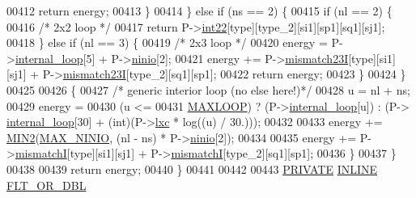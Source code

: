 \begin{DoxyCode}
00412         \textcolor{keywordflow}{return} energy;
00413       \}
00414     \} \textcolor{keywordflow}{else} \textcolor{keywordflow}{if} (ns == 2) \{
00415       \textcolor{keywordflow}{if} (nl == 2) \{
00416         \textcolor{comment}{/* 2x2 loop */}
00417         \textcolor{keywordflow}{return} P->\mbox{\hyperlink{group__energy__parameters_ad56fdeadc2a2e51b9f23b2c26d067ec4}{int22}}[type][type\_2][si1][sp1][sq1][sj1];
00418       \} \textcolor{keywordflow}{else} \textcolor{keywordflow}{if} (nl == 3) \{
00419         \textcolor{comment}{/* 2x3 loop */}
00420         energy  = P->\mbox{\hyperlink{group__energy__parameters_a2a4fb2c65023ec371c9b96573da6d2fc}{internal\_loop}}[5] + P->\mbox{\hyperlink{group__energy__parameters_ac03c4835310b225a64ea9eb77a174940}{ninio}}[2];
00421         energy  += P->\mbox{\hyperlink{group__energy__parameters_a2d8a2ed8936cd60fbed953a2bc64f9b3}{mismatch23I}}[type][si1][sj1] + P->\mbox{\hyperlink{group__energy__parameters_a2d8a2ed8936cd60fbed953a2bc64f9b3}{mismatch23I}}[type\_2][sq1][sp1];
00422         \textcolor{keywordflow}{return} energy;
00423       \}
00424     \}
00425 
00426     \{
00427       \textcolor{comment}{/* generic interior loop (no else here!)*/}
00428       u       = nl + ns;
00429       energy  =
00430         (u <=
00431          \mbox{\hyperlink{energy__const_8h_ad1bd6eabac419670ddd3c9ed82145988}{MAXLOOP}}) ? (P->\mbox{\hyperlink{group__energy__parameters_a2a4fb2c65023ec371c9b96573da6d2fc}{internal\_loop}}[u]) : (P->
      \mbox{\hyperlink{group__energy__parameters_a2a4fb2c65023ec371c9b96573da6d2fc}{internal\_loop}}[30] + (int)(P->\mbox{\hyperlink{group__energy__parameters_a24ea058414d3fb918c7fbf189a4a1e51}{lxc}} * log((u) / 30.)));
00432 
00433       energy += \mbox{\hyperlink{group__utils_gae0b9cd0ce090bd69b951aa73e8fa4f7d}{MIN2}}(\mbox{\hyperlink{energy__par_8h_a700828dfe2f8687d005949773c9c7e7c}{MAX\_NINIO}}, (nl - ns) * P->\mbox{\hyperlink{group__energy__parameters_ac03c4835310b225a64ea9eb77a174940}{ninio}}[2]);
00434 
00435       energy += P->\mbox{\hyperlink{group__energy__parameters_af1a456ce5983b107c47e5dd25727205e}{mismatchI}}[type][si1][sj1] + P->\mbox{\hyperlink{group__energy__parameters_af1a456ce5983b107c47e5dd25727205e}{mismatchI}}[type\_2][sq1][sp1];
00436     \}
00437   \}
00438 
00439   \textcolor{keywordflow}{return} energy;
00440 \}
00441 
00442 
00443 \mbox{\hyperlink{edit__cost_8h_a5e151c615eda34903514212f05a5ccf8}{PRIVATE}} \mbox{\hyperlink{interior__loops_8h_a2eb6f9e0395b47b8d5e3eeae4fe0c116}{INLINE}} \mbox{\hyperlink{group__data__structures_ga31125aeace516926bf7f251f759b6126}{FLT\_OR\_DBL}}

\end{DoxyCode}
